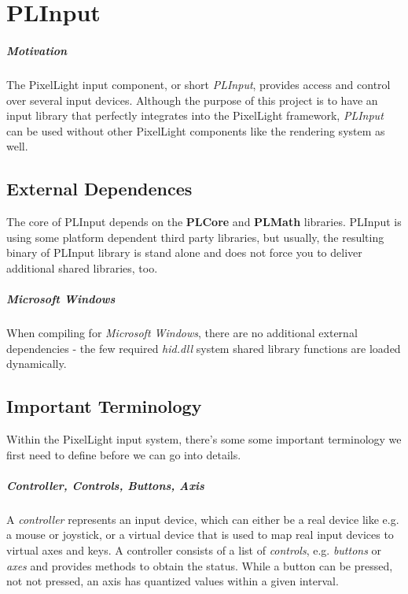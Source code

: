 \chapter{PLInput}


\paragraph{Motivation}
The PixelLight input component, or short \emph{PLInput}, provides access and control over several input devices. Although the purpose of this project is to have an input library that perfectly integrates into the PixelLight framework, \emph{PLInput} can be used without other PixelLight components like the rendering system as well.




\section{External Dependences}
The core of PLInput depends on the \textbf{PLCore} and \textbf{PLMath} libraries. PLInput is using some platform dependent third party libraries, but usually, the resulting binary of PLInput library is stand alone and does not force you to deliver additional shared libraries, too.


\paragraph{Microsoft Windows}
When compiling for \emph{Microsoft Windows}, there are no additional external dependencies - the few required \emph{hid.dll} system shared library functions are loaded dynamically.




\section{Important Terminology}
Within the PixelLight input system, there's some some important terminology we first need to define before we can go into details.


\paragraph{Controller, Controls, Buttons, Axis}
A \emph{controller} represents an input device, which can either be a real device like e.g. a mouse or joystick, or a virtual device that is used to map real input devices to virtual axes and keys. A controller consists of a list of \emph{controls}, e.g. \emph{buttons} or \emph{axes} and provides methods to obtain the status. While a button can be pressed, not not pressed, an axis has quantized values within a given interval.


